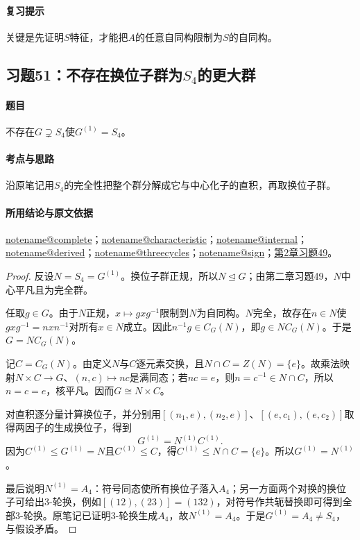 \documentclass[UTF8,a4paper,11pt,fontset=windows]{ctexart}
\makeatletter
\newcommand{\noteref}[1]{\hyperref[note:#1]{\csname notename@#1\endcsname}}
\newcommand{\exref}[2]{\hyperref[ex:#1:#2]{第#1章习题#2}}
\makeatother
\begin{document}
\paragraph{复习提示}
关键是先证明$S$特征，才能把$A$的任意自同构限制为$S$的自同构。


\subsection{习题51：\texorpdfstring{不存在换位子群为$S_4$的更大群}{不存在换位子群为S4的更大群}}
\label{ex:2:51}

\paragraph{题目}
不存在$G\supsetneq S_4$使$G^{(1)}=S_4$。

\paragraph{考点与思路}
沿原笔记用$S_4$的完全性把整个群分解成它与中心化子的直积，再取换位子群。

\paragraph{所用结论与原文依据}
\noteref{complete}；\noteref{characteristic}；\noteref{internal}；\noteref{derived}；\noteref{threecycles}；\noteref{sign}；\exref{2}{49}。


\begin{proof}
反设$N=S_4=G^{(1)}$。换位子群正规，所以$N\trianglelefteq G$；由第二章习题49，$N$中心平凡且为完全群。

任取$g\in G$。由于$N$正规，$x\mapsto gxg^{-1}$限制到$N$为自同构。$N$完全，故存在$n\in N$使$gxg^{-1}=nxn^{-1}$对所有$x\in N$成立。因此$n^{-1}g\in C_G(N)$，即$g\in NC_G(N)$。于是$G=NC_G(N)$。

记$C=C_G(N)$。由定义$N$与$C$逐元素交换，且$N\cap C=Z(N)=\{e\}$。故乘法映射$N\times C\to G$、$(n,c)\mapsto nc$是满同态；若$nc=e$，则$n=c^{-1}\in N\cap C$，所以$n=c=e$，核平凡。因而$G\cong N\times C$。

对直积逐分量计算换位子，并分别用$[(n_1,e),(n_2,e)]$、$[(e,c_1),(e,c_2)]$取得两因子的生成换位子，得到
\[
G^{(1)}=N^{(1)}C^{(1)}.
\]
因为$C^{(1)}\leq G^{(1)}=N$且$C^{(1)}\leq C$，得$C^{(1)}\leq N\cap C=\{e\}$。所以$G^{(1)}=N^{(1)}$。

最后说明$N^{(1)}=A_4$：符号同态使所有换位子落入$A_4$；另一方面两个对换的换位子可给出3-轮换，例如$[(12),(23)]=(132)$，对符号作共轭替换即可得到全部3-轮换。原笔记已证明3-轮换生成$A_4$，故$N^{(1)}=A_4$。于是$G^{(1)}=A_4\ne S_4$，与假设矛盾。
\end{proof}
\end{document}
